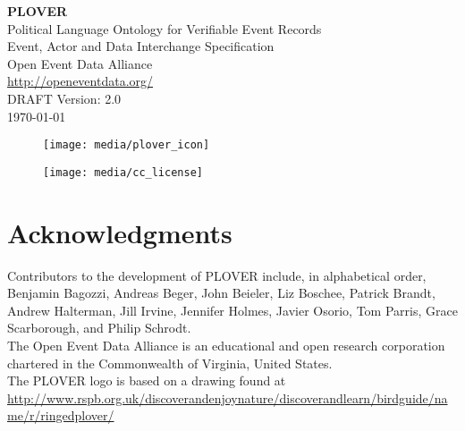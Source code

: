 \documentclass[11pt]{report}
\begin{document}

\vspace{-10pt}	

      \begin{center}
            {\Huge \bfseries PLOVER\ }\\[2ex]
            {\LARGE Political Language Ontology for Verifiable Event Records\\ [2ex]Event, Actor and Data Interchange Specification}\\[10ex]
            {\LARGE Open Event Data Alliance} \\[2ex]
            {\Large \url{http://openeventdata.org/} }\\[2ex]
            {\LARGE DRAFT Version: 2.0\\ [2EX]\monthyeardate\today}
        \end{center}


\begin{figure}[h!]
\centering
\texttt{[image: media/plover\_icon]}
\end{figure}

\vspace{20pt}	


\begin{figure}[h!]
\centering
\texttt{[image: media/cc\_license]}
\end{figure}






\chapter*{Acknowledgments}

\noindent Contributors to the development of PLOVER include, in alphabetical order, Benjamin Bagozzi, Andreas Beger, John Beieler, Liz Boschee, Patrick Brandt, Andrew Halterman, Jill Irvine, Jennifer Holmes, Javier Osorio, Tom Parris, Grace Scarborough, and Philip Schrodt.\\

\noindent The Open Event Data Alliance is an educational and open research corporation chartered in the Commonwealth of Virginia, United States.\\

\noindent The PLOVER logo is based on a drawing found at\\ {\footnotesize \url{http://www.rspb.org.uk/discoverandenjoynature/discoverandlearn/birdguide/name/r/ringedplover/}}\\
\end{document}
